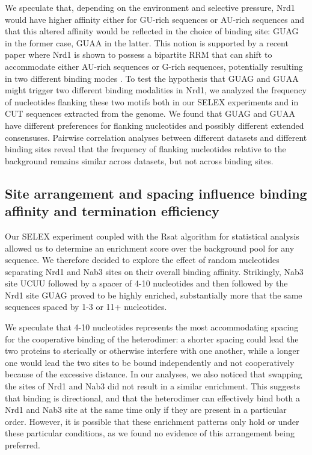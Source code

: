 We speculate that, depending on the environment and selective pressure, Nrd1 would have higher affinity either for GU-rich sequences or AU-rich sequences and that this altered affinity would be reflected in the choice of binding site: GUAG in the former case, GUAA in the latter. This notion is supported by a recent paper where Nrd1 is shown to possess a bipartite RRM that can shift to accommodate either AU-rich sequences or G-rich sequences, potentially resulting in two different binding modes \cite{bacikova:2014:structure}.  To test the hypothesis that GUAG and GUAA might trigger two different binding modalities in Nrd1, we analyzed the frequency of nucleotides flanking these two motifs both in our SELEX experiments and in CUT sequences extracted from the genome. We found that GUAG and GUAA have different preferences for flanking nucleotides and possibly different extended consensuses. Pairwise correlation analyses between different datasets and different binding sites reveal that the frequency of flanking nucleotides relative to the background remains similar across datasets, but not across binding sites.

\singlespacing
\subsection{Site arrangement and spacing influence binding affinity and termination efficiency}
\doublespacing

Our SELEX experiment coupled with the Rsat algorithm for statistical analysis \cite{vanhelden:1998:extracting} allowed us to determine an enrichment score over the background pool for any sequence. We therefore decided to explore the effect of random nucleotides separating Nrd1 and Nab3 sites on their overall binding affinity. Strikingly, Nab3 site UCUU followed by a spacer of 4-10 nucleotides and then followed by the Nrd1 site GUAG proved to be highly enriched, substantially more that the same sequences spaced by 1-3 or 11+ nucleotides.

We speculate that 4-10 nucleotides represents the most accommodating spacing for the cooperative binding of the heterodimer: a shorter spacing could lead the two proteins to sterically or otherwise interfere with one another, while a longer one would lead the two sites to be bound independently and not cooperatively because of the excessive distance. In our analyses, we also noticed that swapping the sites of Nrd1 and Nab3 did not result in a similar enrichment. This suggests that binding is directional, and that the heterodimer can effectively bind both a Nrd1 and Nab3 site at the same time only if they are present in a particular order. However, it is possible that these enrichment patterns only hold \invitro{} or under these particular conditions, as we found no \invivo{} evidence of this arrangement being preferred.

